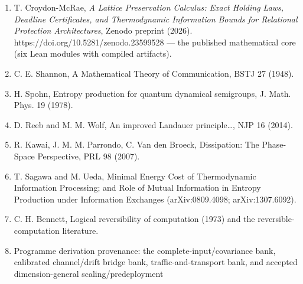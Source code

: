 \documentclass[
]{article}
\providecommand{\tightlist}{%
  \setlength{\itemsep}{0pt}\setlength{\parskip}{0pt}}
\begin{document}
\begin{enumerate}
\def\labelenumi{\arabic{enumi}.}
\tightlist
\item
  T. Croydon-McRae, \emph{A Lattice Preservation Calculus: Exact Holding
  Laws, Deadline Certificates, and Thermodynamic Information Bounds for
  Relational Protection Architectures}, Zenodo preprint (2026).
  h\allowbreak{}t\allowbreak{}t\allowbreak{}p\allowbreak{}s\allowbreak{}:\allowbreak{}/\allowbreak{}/\allowbreak{}d\allowbreak{}o\allowbreak{}i\allowbreak{}.\allowbreak{}o\allowbreak{}r\allowbreak{}g\allowbreak{}/\allowbreak{}1\allowbreak{}0\allowbreak{}.\allowbreak{}5\allowbreak{}2\allowbreak{}8\allowbreak{}1\allowbreak{}/\allowbreak{}z\allowbreak{}e\allowbreak{}n\allowbreak{}o\allowbreak{}d\allowbreak{}o\allowbreak{}.\allowbreak{}2\allowbreak{}3\allowbreak{}5\allowbreak{}9\allowbreak{}9\allowbreak{}5\allowbreak{}2\allowbreak{}8
  --- the published mathematical core (six Lean modules with compiled
  artifacts).
\item
  C. E. Shannon, A Mathematical Theory of Communication, BSTJ 27 (1948).
\item
  H. Spohn, Entropy production for quantum dynamical semigroups, J.
  Math. Phys. 19 (1978).
\item
  D. Reeb and M. M. Wolf, An improved Landauer principle\ldots, NJP 16
  (2014).
\item
  R. Kawai, J. M. M. Parrondo, C. Van den Broeck, Dissipation: The
  Phase-Space Perspective, PRL 98 (2007).
\item
  T. Sagawa and M. Ueda, Minimal Energy Cost of Thermodynamic
  Information Processing; and Role of Mutual Information in Entropy
  Production under Information Exchanges (arXiv:0809.4098;
  arXiv:1307.6092).
\item
  C. H. Bennett, Logical reversibility of computation (1973) and the
  reversible-computation literature.
\item
  Programme derivation provenance: the
  c\allowbreak{}o\allowbreak{}m\allowbreak{}p\allowbreak{}l\allowbreak{}e\allowbreak{}t\allowbreak{}e\allowbreak{}-\allowbreak{}i\allowbreak{}n\allowbreak{}p\allowbreak{}u\allowbreak{}t\allowbreak{}/\allowbreak{}c\allowbreak{}o\allowbreak{}v\allowbreak{}a\allowbreak{}r\allowbreak{}i\allowbreak{}a\allowbreak{}n\allowbreak{}c\allowbreak{}e
  bank, calibrated channel/drift bridge bank, traffic-and-transport
  bank, and accepted dimension-general
  s\allowbreak{}c\allowbreak{}a\allowbreak{}l\allowbreak{}i\allowbreak{}n\allowbreak{}g\allowbreak{}/\allowbreak{}p\allowbreak{}r\allowbreak{}e\allowbreak{}d\allowbreak{}e\allowbreak{}p\allowbreak{}l\allowbreak{}o\allowbreak{}y\allowbreak{}m\allowbreak{}e\allowbreak{}n\allowbreak{}t

\end{enumerate}
\end{document}
